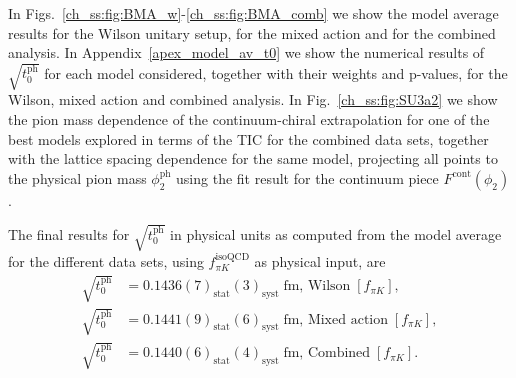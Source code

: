 In Figs.~\ref{ch_ss:fig:BMA_w}-\ref{ch_ss:fig:BMA_comb} we show the model average results for the Wilson unitary setup, for the mixed action and for the combined analysis. In Appendix~\ref{apex_model_av_t0} we show the numerical results of $\sqrt{t_0^{\textrm{ph}}}$ for each model considered, together with their weights and p-values, for the Wilson, mixed action and combined analysis. In Fig.~\ref{ch_ss:fig:SU3a2} we show the pion mass dependence of the continuum-chiral extrapolation for one of the best models explored in terms of the TIC for the combined data sets, together with the lattice spacing dependence for the same model, projecting all points to the physical pion mass $\phi_2^{\textrm{ph}}$ using the fit result for the continuum piece $F^{\textrm{cont}}(\phi_2)$.

The final results for $\sqrt{t_0^{\textrm{ph}}}$ in physical units as computed from the model average for the different data sets, using $f_{\pi K}^{\textrm{isoQCD}}$ as physical input, are
\begin{align}
\label{ch_ss:eq:t0ph_w}
\sqrt{t_0^{\textrm{ph}}}&=0.1436(7)_{\textrm{stat}}(3)_{\textrm{syst}}\;\textrm{fm, Wilson}\;[f_{\pi K}], \\
\label{ch_ss:eq:t0ph_tm}
\sqrt{t_0^{\textrm{ph}}}&=0.1441(9)_{\textrm{stat}}(6)_{\textrm{syst}}\;\textrm{fm, Mixed action}\;[f_{\pi K}], \\
\label{ch_ss:eq:t0ph_c}
\sqrt{t_0^{\textrm{ph}}}&=0.1440(6)_{\textrm{stat}}(4)_{\textrm{syst}}\;\textrm{fm, Combined}\;[f_{\pi K}].
\end{align}

